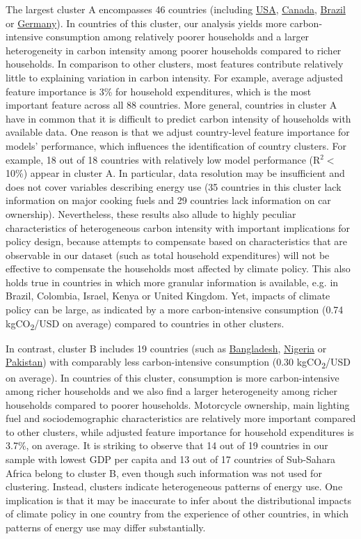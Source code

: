 \documentclass[12pt, a4paper]{article}
\begin{document}
The largest cluster A encompasses 46 countries (including \hyperref[fig:5b_USA]{USA}, \hyperref[fig:5b_CAN]{Canada}, \hyperref[fig:5b_BRA]{Brazil} or \hyperref[fig:5b_DEU]{Germany}). In countries of this cluster, our analysis yields more carbon-intensive consumption among relatively poorer households and a larger heterogeneity in carbon intensity among poorer households compared to richer households. In comparison to other clusters, most features contribute relatively little to explaining variation in carbon intensity. For example, average adjusted feature importance is 3\% for household expenditures, which is the most important feature across all 88 countries. More general, countries in cluster A have in common that it is difficult to predict carbon intensity of households with available data. One reason is that we adjust country-level feature importance for models' performance, which influences the identification of country clusters. For example, 18 out of 18 countries with relatively low model performance (R$^{2}<$10\%) appear in cluster A. In particular, data resolution may be insufficient and does not cover variables describing energy use (35 countries in this cluster lack information on major cooking fuels and 29 countries lack information on car ownership). Nevertheless, these results also allude to highly peculiar characteristics of heterogeneous carbon intensity with important implications for policy design, because attempts to compensate based on characteristics that are observable in our dataset (such as total household expenditures) will not be effective to compensate the households most affected by climate policy. This also holds true in countries in which more granular information is available, e.g. in Brazil, Colombia, Israel, Kenya or United Kingdom. Yet, impacts of climate policy can be large, as indicated by a more carbon-intensive consumption (0.74 kgCO\textsubscript{2}/USD on average) compared to countries in other clusters. 

In contrast, cluster B includes 19 countries (such as \hyperref[fig:5b_BGD]{Bangladesh}, \hyperref[fig:5b_NGA]{Nigeria} or \hyperref[fig:5b_PAK]{Pakistan}) with comparably less carbon-intensive consumption (0.30 kgCO\textsubscript{2}/USD on average). In countries of this cluster, consumption is more carbon-intensive among richer households and we also find a larger heterogeneity among richer households compared to poorer households. Motorcycle ownership, main lighting fuel and sociodemographic characteristics are relatively more important compared to other clusters, while adjusted feature importance for household expenditures is 3.7\%, on average. It is striking to observe that 14 out of 19 countries in our sample with lowest GDP per capita and 13 out of 17 countries of Sub-Sahara Africa belong to cluster B, even though such information was not used for clustering. Instead, clusters indicate heterogeneous patterns of energy use. One implication is that it may be inaccurate to infer about the distributional impacts of climate policy in one country from the experience of other countries, in which patterns of energy use may differ substantially.
\end{document}
